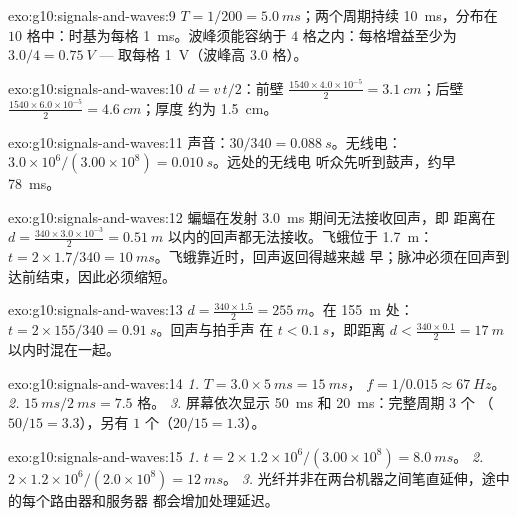 \begin{solution}{exo:g10:signals-and-waves:9}
$T = 1/200 = \qty{5.0}{ms}$；两个周期持续 \qty{10}{ms}，分布在
$10$ 格中：时基为每格 \qty{1}{ms}。波峰须能容纳于
$4$ 格之内：每格增益至少为 $3.0/4 = \qty{0.75}{V}$ ---
取每格 \qty{1}{V}（波峰高 $3.0$ 格）。
\end{solution}

\begin{solution}{exo:g10:signals-and-waves:10}
$d = v\,t/2$：前壁
$\frac{1540 \times 4.0\times10^{-5}}{2} = \qty{3.1}{cm}$；后壁
$\frac{1540 \times 6.0\times10^{-5}}{2} = \qty{4.6}{cm}$；厚度
约为 \qty{1.5}{cm}。
\end{solution}

\begin{solution}{exo:g10:signals-and-waves:11}
声音：$30/340 = \qty{0.088}{s}$。无线电：
$3.0\times10^{6}/(3.00\times10^{8}) = \qty{0.010}{s}$。远处的无线电
听众先听到鼓声，约早 \qty{78}{ms}。
\end{solution}

\begin{solution}{exo:g10:signals-and-waves:12}
蝙蝠在发射 \qty{3.0}{ms} 期间无法接收回声，即
距离在 $d = \frac{340 \times 3.0\times10^{-3}}{2} =
\qty{0.51}{m}$ 以内的回声都无法接收。飞蛾位于 \qty{1.7}{m}：
$t = 2 \times 1.7/340 = \qty{10}{ms}$。飞蛾靠近时，回声返回得越来越
早；脉冲必须在回声到达前结束，因此必须缩短。
\end{solution}

\begin{solution}{exo:g10:signals-and-waves:13}
$d = \frac{340 \times 1.5}{2} = \qty{255}{m}$。在 \qty{155}{m} 处：
$t = 2 \times 155/340 = \qty{0.91}{s}$。回声与拍手声
在 $t < \qty{0.1}{s}$，即距离
$d < \frac{340 \times 0.1}{2} = \qty{17}{m}$ 以内时混在一起。
\end{solution}

\begin{solution}{exo:g10:signals-and-waves:14}
\emph{1.} $T = 3.0 \times \qty{5}{ms} = \qty{15}{ms}$，
$f = 1/0.015 \approx \qty{67}{Hz}$。
\emph{2.} $\qty{15}{ms}/\qty{2}{ms} = 7.5$ 格。
\emph{3.} 屏幕依次显示 \qty{50}{ms} 和 \qty{20}{ms}：完整周期 $3$ 个
（$50/15 = 3.3$），另有 $1$ 个（$20/15 = 1.3$）。
\end{solution}

\begin{solution}{exo:g10:signals-and-waves:15}
\emph{1.} $t = 2 \times 1.2\times10^{6}/(3.00\times10^{8}) =
\qty{8.0}{ms}$。
\emph{2.} $2 \times 1.2\times10^{6}/(2.0\times10^{8}) = \qty{12}{ms}$。
\emph{3.} 光纤并非在两台机器之间笔直延伸，途中的每个路由器和服务器
都会增加处理延迟。
\end{solution}

